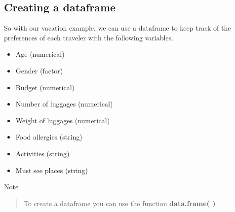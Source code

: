 \documentclass[
]{book}
\begin{document}
\hypertarget{creating-a-dataframe}{%
\subsection{Creating a dataframe}\label{creating-a-dataframe}}

So with our vacation example, we can use a dataframe to keep track of the preferences of each traveler with the following variables.

\begin{itemize}
\item
  Age (numerical)
\item
  Gender (factor)
\item
  Budget (numerical)
\item
  Number of luggages (numerical)
\item
  Weight of luggages (numerical)
\item
  Food allergies (string)
\item
  Activities (string)
\item
  Must see places (string)
\end{itemize}

Note

\begin{quote}
To create a dataframe you can use the function \textbf{data.frame( )}
\end{quote}
\end{document}
